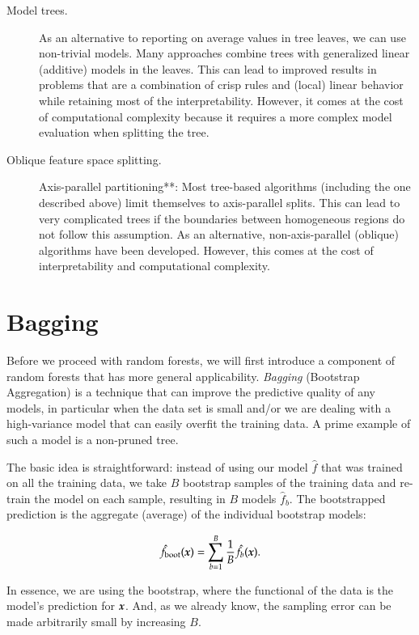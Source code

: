 \begin{refsection}
\begin{description}
\item[Model trees.] As an alternative to reporting on average values in tree leaves, we can use non-trivial models. Many approaches combine trees with generalized linear (additive) models in the leaves. This can lead to improved results in problems that are a combination of crisp rules and (local) linear behavior while retaining most of the interpretability. However, it comes at the cost of computational complexity because it requires a more complex model evaluation when splitting the tree.

\item[Oblique feature space splitting.] Axis-parallel partitioning**: Most tree-based algorithms (including the one described above) limit themselves to axis-parallel splits. This can lead to very complicated trees if the boundaries between homogeneous regions do not follow this assumption. As an alternative, non-axis-parallel (oblique) algorithms have been developed. However, this comes at the cost of interpretability and computational complexity.
\end{description}

\section{Bagging}

Before we proceed with random forests, we will first introduce a component of random forests that has more general applicability. {\em Bagging} (Bootstrap Aggregation) is a technique that can improve the predictive quality of any models, in particular when the data set is small and/or we are dealing with a high-variance model that can easily overfit the training data. A prime example of such a model is a non-pruned tree.

The basic idea is straightforward: instead of using our model $\hat{f}$ that was trained on all the training data, we take $B$ bootstrap samples of the training data and re-train the model on each sample, resulting in $B$ models $\hat{f}_b$. The bootstrapped prediction is the aggregate (average) of the individual bootstrap models:

$$\hat{f}_{\text{boot}}(\boldsymbol{x}) = \sum_{b=1}^B {1\over B} \hat{f}_b(\boldsymbol{x}).$$

In essence, we are using the bootstrap, where the functional of the data is the model's prediction for $\boldsymbol{x}$. And, as we already know, the sampling error can be made arbitrarily small by increasing $B$.


\end{refsection}
